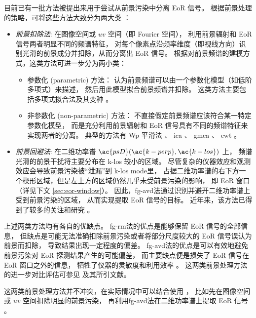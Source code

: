 目前已有一批方法被提出来用于尝试从前景污染中分离 EoR 信号。
根据前景处理的策略，可将这些方法大致分为两大类 \cite{chapman2015,chapman2016}：
\begin{itemize}
\item \emph{前景扣除法}:
在图像空间或 $uv$ 空间（即 Fourier 空间），
利用前景辐射和 EoR 信号两者明显不同的频谱特征，
对每个像素点沿频率维度（即视线方向）识别光滑的前景成分并扣除，从而分离出 EoR 信号。
根据对前景频谱的建模方式，这类方法可进一步分为两小类：
\begin{itemize}
  \item 参数化 (parametric) 方法：
    认为前景频谱可以由一个参数化模型（如低阶多项式）来描述，
    然后用此模型拟合前景频谱并扣除。
    这类方法主要包括多项式拟合法及其变种
    \cite{wang2006,jelic2008,liu2009fgrm,wang2013,bonaldi2015}。
  \item 非参数化 (non-parametric) 方法：
    不直接假定前景频谱应该符合某一特定参数化模型，
    而是充分利用前景辐射和 EoR 信号具有不同的频谱特征来实现两者的分离。
    典型的方法有 Wp 平滑法 \cite{harker2009}、
    \ac{ica} \cite{chapman2012}、
    \ac{gmca} \cite{chapman2013}、
    \ac{cwt} \cite{gu2013}。
\end{itemize}

\item \emph{前景回避法}:
在二维功率谱 $\ac{psD}(\ac{k-perp}, \ac{k-los})$ 上，
频谱光滑的前景干扰将主要分布在 \ac{k-los} 较小的区域。
尽管复杂的仪器效应和观测效应会导致前景污染被\enquote{泄漏}到 \ac{k-los} \ac{mode}里，
占据二维功率谱的右下方一个楔形区域，但是左上方的区域仍然几乎未受前景污染的影响，
即 EoR 窗口（详见下文 \autoref{sec:eor-window}）。
因此，\ac{fg-avd}法通过识别并避开二维功率谱上受到前景污染的区域，
从而实现提取 EoR 信号的目标。
近年来，该方法已得到了较多的关注和研究 \cite{thyagarajan2013,liu2014,liu2014ii,
  barry2016,beardsley2016,trott2016,patil2017}。

\end{itemize}

上述两类方法均有各自的优缺点。
\ac{fg-rm}法的优点是能够保留 EoR 信号的全部信息，
但缺点是可能无法准确扣除前景污染或者将部分尺度较大的 EoR 信号误认为前景而扣除，
导致结果出现一定程度的偏差。
\ac{fg-avd}法的优点是可以有效地避免前景污染对 EoR 探测结果产生的可能偏差，
而主要缺点便是损失了 EoR 信号在 EoR 窗口之外的信息，
牺牲了仪器的灵敏度和利用效率 \cite{pober2014}。
这两类前景处理方法的进一步对比评估可参见  及其所引文献。

这两类前景处理方法并不冲突，在实际情况中可以结合使用 \cite{kerrigan2018}，
比如先在图像空间或 $uv$ 空间扣除明显的前景污染，
再利用\ac{fg-avd}法在二维功率谱上提取 EoR 信号 \cite{datta2010}。


